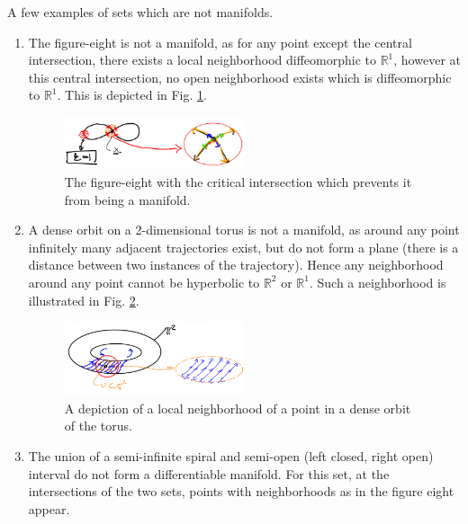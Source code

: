 \begin{ex}
	A few examples of sets which are not manifolds.
	\begin{enumerate}
		\item The figure-eight is not a manifold, as for any point except the central intersection, there exists a local neighborhood diffeomorphic to $\mathbb{R}^{1}$, however at this central intersection, no open neighborhood exists which is diffeomorphic to $\mathbb{R}^{1}$. This is depicted in Fig. \ref{fig:figure_eight}.
			\begin{figure}[h!]
				\centering
				\includegraphics[width=0.5\textwidth]{figures/ch9/3b_figure_eight.png}
				\caption{The figure-eight with the critical intersection which prevents it from being a manifold.}
				\label{fig:figure_eight}
			\end{figure}
		\item A dense orbit on a 2-dimensional torus is not a manifold, as around any point infinitely many adjacent trajectories exist, but do not form a plane (there is a distance between two instances of the trajectory). Hence any neighborhood around any point cannot be hyperbolic to $\mathbb{R}^{2}$ or $\mathbb{R}^{1}$. Such a neighborhood is illustrated in Fig. \ref{fig:dense_orbit_mfd}.
			\begin{figure}[h!]
				\centering
				\includegraphics[width=0.5\textwidth]{figures/ch9/4dense_orbits_mfd.png}
				\caption{A depiction of a local neighborhood of a point in a dense orbit of the torus.}
				\label{fig:dense_orbit_mfd}
			\end{figure}
		\item The union of a semi-infinite spiral and semi-open (left closed, right open) interval do not form a differentiable manifold. For this set, at the intersections of the two sets, points with neighborhoods as in the figure eight appear.
	\end{enumerate}
\end{ex}

